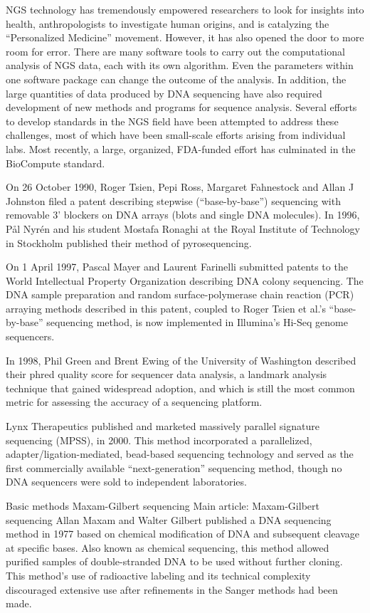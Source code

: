 NGS technology has tremendously empowered researchers to look for insights into health, anthropologists to investigate human origins, and is catalyzing the ``Personalized Medicine'' movement. However, it has also opened the door to more room for error. There are many software tools to carry out the computational analysis of NGS data, each with its own algorithm. Even the parameters within one software package can change the outcome of the analysis. In addition, the large quantities of data produced by DNA sequencing have also required development of new methods and programs for sequence analysis. Several efforts to develop standards in the NGS field have been attempted to address these challenges, most of which have been small-scale efforts arising from individual labs. Most recently, a large, organized, FDA-funded effort has culminated in the BioCompute standard.

On 26 October 1990, Roger Tsien, Pepi Ross, Margaret Fahnestock and Allan J Johnston filed a patent describing stepwise (``base-by-base'') sequencing with removable 3' blockers on DNA arrays (blots and single DNA molecules). In 1996, Pål Nyrén and his student Mostafa Ronaghi at the Royal Institute of Technology in Stockholm published their method of pyrosequencing.

On 1 April 1997, Pascal Mayer and Laurent Farinelli submitted patents to the World Intellectual Property Organization describing DNA colony sequencing. The DNA sample preparation and random surface-polymerase chain reaction (PCR) arraying methods described in this patent, coupled to Roger Tsien et al.'s ``base-by-base'' sequencing method, is now implemented in Illumina's Hi-Seq genome sequencers.

In 1998, Phil Green and Brent Ewing of the University of Washington described their phred quality score for sequencer data analysis, a landmark analysis technique that gained widespread adoption, and which is still the most common metric for assessing the accuracy of a sequencing platform.

Lynx Therapeutics published and marketed massively parallel signature sequencing (MPSS), in 2000. This method incorporated a parallelized, adapter/ligation-mediated, bead-based sequencing technology and served as the first commercially available ``next-generation'' sequencing method, though no DNA sequencers were sold to independent laboratories.

Basic methods
Maxam-Gilbert sequencing
Main article: Maxam-Gilbert sequencing
Allan Maxam and Walter Gilbert published a DNA sequencing method in 1977 based on chemical modification of DNA and subsequent cleavage at specific bases. Also known as chemical sequencing, this method allowed purified samples of double-stranded DNA to be used without further cloning. This method's use of radioactive labeling and its technical complexity discouraged extensive use after refinements in the Sanger methods had been made.

